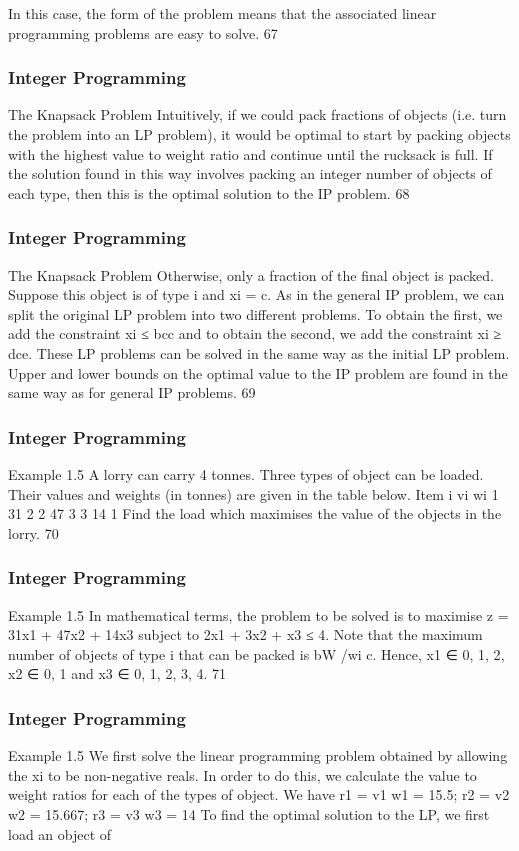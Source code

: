 \begin{frame}
In this case, the form of the problem means that the associated
linear programming problems are easy to solve.
67 \end{frame}  \begin{frame} \frametitle{Integer Programming}     
The Knapsack Problem
Intuitively, if we could pack fractions of objects (i.e. turn the
problem into an LP problem), it would be optimal to start by
packing objects with the highest value to weight ratio and continue
until the rucksack is full.
If the solution found in this way involves packing an integer
number of objects of each type, then this is the optimal solution to
the IP problem.
68 \end{frame}  \begin{frame} \frametitle{Integer Programming}     
The Knapsack Problem
Otherwise, only a fraction of the final object is packed.
Suppose this object is of type i and xi = c. As in the general IP
problem, we can split the original LP problem into two different
problems. To obtain the first, we add the constraint xi ≤ bcc and
to obtain the second, we add the constraint xi ≥ dce.
These LP problems can be solved in the same way as the initial LP
problem.
Upper and lower bounds on the optimal value to the IP problem
are found in the same way as for general IP problems.
69 \end{frame}  \begin{frame} \frametitle{Integer Programming}     
Example 1.5
A lorry can carry 4 tonnes. Three types of object can be loaded.
Their values and weights (in tonnes) are given in the table below.
Item i vi wi
1 31 2
2 47 3
3 14 1
Find the load which maximises the value of the objects in the lorry.
70 \end{frame}  \begin{frame} \frametitle{Integer Programming}     
Example 1.5
In mathematical terms, the problem to be solved is to maximise
z = 31x1 + 47x2 + 14x3
subject to
2x1 + 3x2 + x3 ≤ 4.
Note that the maximum number of objects of type i that can be
packed is bW /wi c.
Hence, x1 ∈ {0, 1, 2}, x2 ∈ {0, 1} and x3 ∈ {0, 1, 2, 3, 4}.
71 \end{frame}  \begin{frame} \frametitle{Integer Programming}     
Example 1.5
We first solve the linear programming problem obtained by
allowing the xi to be non-negative reals.
In order to do this, we calculate the value to weight ratios for each
of the types of object. We have
r1 =
v1
w1
= 15.5; r2 =
v2
w2
= 15.667; r3 =
v3
w3
= 14
To find the optimal solution to the LP, we first load an object of

\end{frame}
